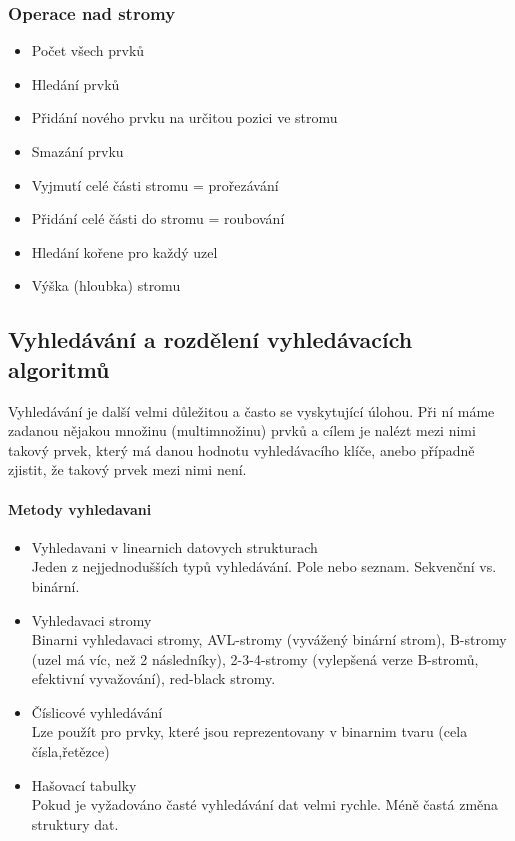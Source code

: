 \documentclass[10pt,a4paper]{article}
\begin{document}
\subsubsection{Operace nad stromy}
\begin{itemize}
	\item Počet všech prvků
	\item Hledání prvků
	\item Přidání nového prvku na určitou pozici ve stromu
	\item Smazání prvku
	\item Vyjmutí celé části stromu = prořezávání
	\item Přidání celé části do stromu = roubování
	\item Hledání kořene pro každý uzel
	\item Výška (hloubka) stromu
\end{itemize}




\subsection{Vyhledávání a rozdělení vyhledávacích algoritmů}
Vyhledávání je další velmi důležitou a často se vyskytující úlohou. Při ní máme zadanou nějakou množinu (multimnožinu) prvků a cílem je nalézt mezi nimi takový prvek, který má danou hodnotu vyhledávacího klíče, anebo případně zjistit, že takový prvek mezi nimi není.
\paragraph{Metody vyhledavani}
\begin{itemize}
	\item Vyhledavani v linearnich datovych strukturach \\
	Jeden z nejjednodušších typů vyhledávání. Pole nebo seznam. Sekvenční vs. binární.
	\item Vyhledavaci stromy \\
	Binarni vyhledavaci stromy, AVL-stromy (vyvážený binární strom), B-stromy (uzel má víc, než 2 následníky), 2-3-4-stromy (vylepšená verze B-stromů, efektivní vyvažování), red-black stromy.
	\item Číslicové vyhledávání \\
	Lze použít pro prvky, které jsou reprezentovany v binarnim tvaru (cela čísla,řetězce)
	\item Hašovací tabulky \\
	Pokud je vyžadováno časté vyhledávání dat velmi rychle. Méně častá změna struktury dat.
\end{itemize}
\end{document}
